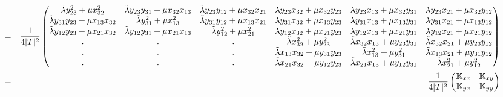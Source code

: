 \begin{landscape}
\begin{eqnarray}
&=&
\frac{1}{4|T|^2} 
\begin{pmatrix}
\tilde\lambda y_{23}^ 2 + \mu x_{32}^2 &
\tilde\lambda y_{23}y_{31} + \mu x_{32}x_{13} &
\tilde\lambda y_{23}y_{12} + \mu x_{32}x_{21} &
\lambda y_{23}x_{32} + \mu x_{32}y_{23} &
\lambda y_{23}x_{13} + \mu x_{32}y_{31} &
\lambda y_{23}x_{21} + \mu x_{32}y_{12}  
\\
\tilde\lambda y_{31}y_{23} + \mu x_{13}x_{32} &
\tilde\lambda y_{31}^2 + \mu x_{13}^2 &
\tilde\lambda y_{31}y_{12} + \mu x_{13}x_{21} &
\lambda y_{31}x_{32} + \mu x_{13}y_{23}  &
\lambda y_{31}x_{13} + \mu x_{13}y_{31}  &
\lambda y_{31}x_{21} + \mu x_{13}y_{12}  
\\
\tilde\lambda y_{12}y_{23} + \mu x_{21}x_{32} &
\tilde\lambda y_{12}y_{31} + \mu x_{21}x_{13} &
\tilde\lambda y_{12}^2 + \mu x_{21}^2 &
\lambda y_{12}x_{32} + \mu x_{21}y_{23}  &
\lambda y_{12}x_{13} + \mu x_{21}y_{31}  &
\lambda y_{12}x_{21} + \mu x_{21}y_{12}  
\\
. & .& . &
\tilde\lambda x_{32}^2 + \mu y_{23}^2 &
\tilde\lambda x_{32}x_{13} + \mu y_{23}y_{31} &
\tilde\lambda x_{32}x_{21} + \mu y_{23}y_{12} 
\\
. & . & . & 
\tilde\lambda x_{13}x_{32} + \mu y_{31}y_{23} &
\tilde\lambda x_{13}^2 + \mu y_{31}^2 &
\tilde\lambda x_{13}x_{21} + \mu y_{31}y_{12} 
\\
. & . & . &
\tilde\lambda x_{21}x_{32} + \mu y_{12}y_{23} &
\tilde\lambda x_{21}x_{13} + \mu y_{12}y_{31} &
\tilde\lambda x_{21}^2 + \mu y_{12}^2 
\end{pmatrix} 
\nonumber\\
&=& \frac{1}{4|T|^2} 
\begin{pmatrix}
{\mathbb{K}}_{xx} & {\mathbb{K}}_{xy} \\
{\mathbb{K}}_{yx} & {\mathbb{K}}_{yy}
\end{pmatrix}
\end{eqnarray}
\end{landscape}

